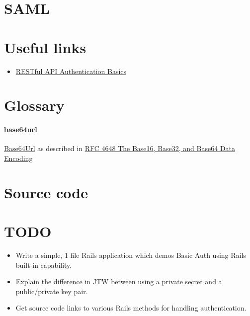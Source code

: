 \documentclass{article}
\begin{document}
\section{SAML}

\section{Useful links}

\begin{itemize}
  \item \href{https://blog.restcase.com/restful-api-authentication-basics/}{%
      RESTful API Authentication Basics}
\end{itemize}


\appendix

\section{Glossary}

\paragraph{base64url} \href{https://en.wikipedia.org/wiki/Base64#URL_applications}{%
  Base64Url} as described in \href{https://tools.ietf.org/html/rfc4648}{%
    RFC 4648 The Base16, Base32, and Base64 Data Encoding}

\section{Source code}

\section{TODO}

\begin{itemize}
  \item Write a simple, 1 file Rails application which demos Basic Auth
    using Rails built-in capability.
  \item Explain the difference in JTW between using a private secret and a
    public/private key pair.
  \item Get source code links to various Rails methods for handling authentication.
\end{itemize}
\end{document}
